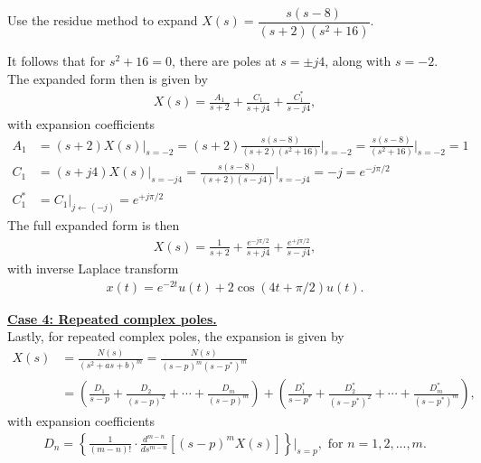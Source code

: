 \documentclass{report}
\begin{document}
\begin{example}
    Use the residue method to expand $X(s)=\dfrac{s(s-8)}{(s+2)(s^2+16)}$. \\
\end{example}
\begin{solution}
    It follows that for $s^2+16=0$, there are poles at $s=\pm j4$, along with $s=-2$. The expanded form then is given by 
    \begin{align*}
        X(s) = \frac{A_1}{s+2} + \frac{C_1}{s+j4} + \frac{C_1^*}{s-j4},
    \end{align*}
    with expansion coefficients
    \begin{align*}
        A_1 &= (s+2)X(s)\big|_{s=-2} = (s+2)\frac{s(s-8)}{(s+2)(s^2+16)}\bigg|_{s=-2} = \frac{s(s-8)}{(s^2+16)}\bigg|_{s=-2} = 1 \\[0.5cm]
        C_1 &= (s+j4)X(s)\big|_{s=-j4} = \frac{s(s-8)}{(s+2)(s-j4)}\bigg|_{s=-j4} = -j = e^{-j\pi/2} \\[0.5cm]
        C_1^* &= C_1\big|_{j\leftarrow(-j)} = e^{+j\pi/2}
    \end{align*}
    The full expanded form is then 
    \begin{align*}
        X(s) = \frac{1}{s+2} + \frac{e^{-j\pi/2}}{s+j4} + \frac{e^{+j\pi/2}}{s-j4},
    \end{align*}
    with inverse Laplace transform 
    \begin{align*}
        x(t) = e^{-2t}u(t) + 2\cos(4t+\pi/2)u(t).
    \end{align*}
\end{solution}
\begin{tcolorbox}[width=\textwidth,colback={white}, sharp corners]
    \textbf{\underline{Case 4: Repeated complex poles.}} \\[0.25cm]
    Lastly, for repeated complex poles, the expansion is given by 
    \begin{align}
        X(s) &= \frac{N(s)}{(s^2+as+b)^m} = \frac{N(s)}{(s-p)^m(s-p^*)^m} \nonumber \\
        &= \left(\frac{D_1}{s-p} + \frac{D_2}{(s-p)^2} + \cdots + \frac{D_m}{(s-p)^m}\right) + \left(\frac{D_1^*}{s-p^*} + \frac{D_2^*}{(s-p^*)^2} + \cdots + \frac{D_m^*}{(s-p^*)^m}\right),
    \end{align}
    with expansion coefficients
    \begin{align}
        D_n = \left\{\frac{1}{(m-n)!}\cdot \frac{d^{m-n}}{ds^{m-n}}[(s-p)^mX(s)]\right\}\bigg|_{s=p}, \text{ for } n=1,2,...,m.
    \end{align}
\end{tcolorbox}
\end{document}
